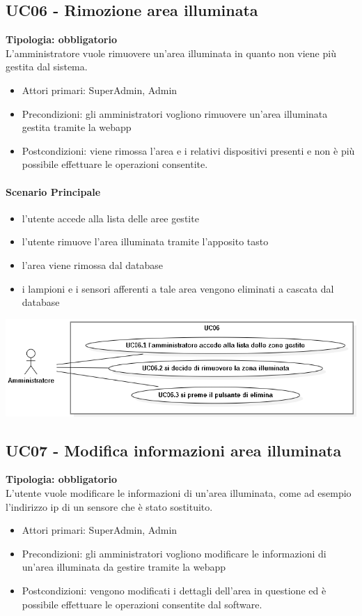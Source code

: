 \documentclass[12pt]{article}
\begin{document}
\subsection{UC06 - Rimozione area illuminata}
\textbf{Tipologia: obbligatorio} \\
L'amministratore vuole rimuovere un'area illuminata in quanto non viene più gestita dal sistema.
\begin{itemize}
	\item Attori primari: SuperAdmin, Admin
	\item Precondizioni: gli amministratori vogliono rimuovere un'area illuminata gestita tramite la webapp
	\item Postcondizioni: viene rimossa l'area e i relativi dispositivi presenti e non è più possibile effettuare le operazioni consentite.
\end{itemize}
\paragraph{Scenario Principale}
\begin{itemize}
	\item l'utente accede alla lista delle aree gestite
	\item l'utente rimuove l'area illuminata tramite l'apposito tasto
	\item l'area viene rimossa dal database 
	\item i lampioni e i sensori afferenti a tale area vengono eliminati a cascata dal database
\end{itemize}

\includegraphics[scale=0.5]{UC06.png}

\subsection{UC07 - Modifica informazioni area illuminata}
\textbf{Tipologia: obbligatorio} \\
L'utente vuole modificare le informazioni di un'area illuminata, come ad esempio l'indirizzo ip di un sensore che è stato sostituito.
\begin{itemize}
	\item Attori primari: SuperAdmin, Admin
	\item Precondizioni: gli amministratori vogliono modificare le informazioni di un'area illuminata da gestire tramite la webapp
	\item Postcondizioni: vengono modificati i dettagli dell'area in questione ed è possibile effettuare le operazioni consentite dal software.
\end{itemize}
\end{document}
